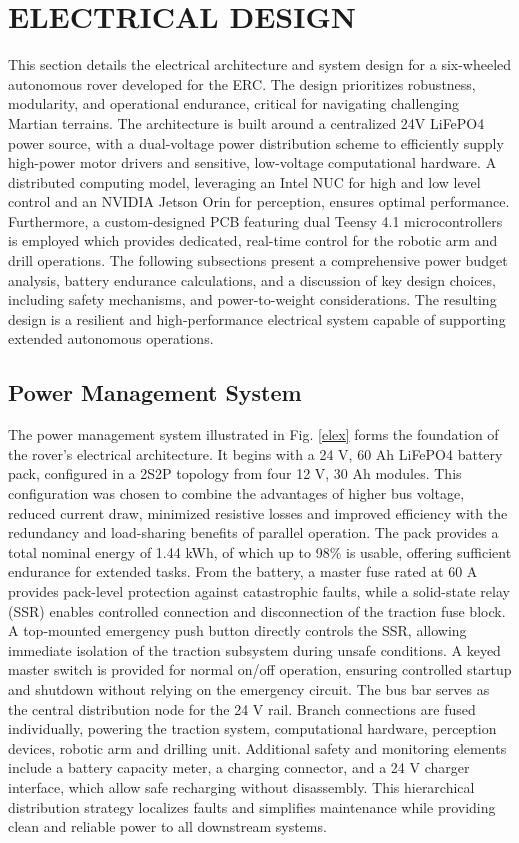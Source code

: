 \documentclass[letterpaper, 10 pt, conference]{ieeeconf}  %
\begin{document}
\section{ELECTRICAL DESIGN}
This section details the electrical architecture and system design for a six-wheeled autonomous rover developed for the ERC. The design prioritizes robustness, modularity, and operational endurance, critical for navigating challenging Martian terrains. The architecture is built around a centralized 24V LiFePO4 power source, with a dual-voltage power distribution scheme to efficiently supply high-power motor drivers and sensitive, low-voltage computational hardware. A distributed computing model, leveraging an Intel NUC for high and low level control and an NVIDIA Jetson Orin for perception, ensures optimal performance. Furthermore, a custom-designed PCB featuring dual Teensy 4.1 microcontrollers is employed which provides dedicated, real-time control for the robotic arm and drill operations. The following subsections present a comprehensive power budget analysis, battery endurance calculations, and a discussion of key design choices, including safety mechanisms, and power-to-weight considerations. The resulting design is a resilient and high-performance electrical system capable of supporting extended autonomous operations.




\subsection{Power Management System}
The power management system illustrated in Fig. \ref{elex} forms the foundation of the rover’s electrical architecture. It begins with a 24 V, 60 Ah LiFePO4 battery pack, configured in a 2S2P topology from four 12 V, 30 Ah modules. This configuration was chosen to combine the advantages of higher bus voltage, reduced current draw, minimized resistive losses and improved efficiency with the redundancy and load-sharing benefits of parallel operation. The pack provides a total nominal energy of 1.44 kWh, of which up to 98\% is usable, offering sufficient endurance for extended tasks. From the battery, a master fuse rated at 60 A provides pack-level protection against catastrophic faults, while a solid-state relay (SSR) enables controlled connection and disconnection of the traction fuse block. A top-mounted emergency push button directly controls the SSR, allowing immediate isolation of the traction subsystem during unsafe conditions. A keyed master switch is provided for normal on/off operation, ensuring controlled startup and shutdown without relying on the emergency circuit.
The bus bar serves as the central distribution node for the 24 V rail. Branch connections are fused individually, powering the traction system, computational hardware, perception devices, robotic arm and drilling unit. Additional safety and monitoring elements include a battery capacity meter, a charging connector, and a 24 V charger interface, which allow safe recharging without disassembly. This hierarchical distribution strategy localizes faults and simplifies maintenance while providing clean and reliable power to all downstream systems.
\end{document}

